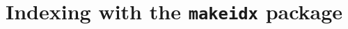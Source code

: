 \documentclass[a4paper]{article}
\begin{document}
\section*{Indexing with the \texttt{makeidx} package}

\nocite{*}

\cite{piccato,gaonkar,malinowski,coleridge,gerhardt,cicero}


\clearpage

\printbibliography
\raggedright
\printindex
\end{document}

